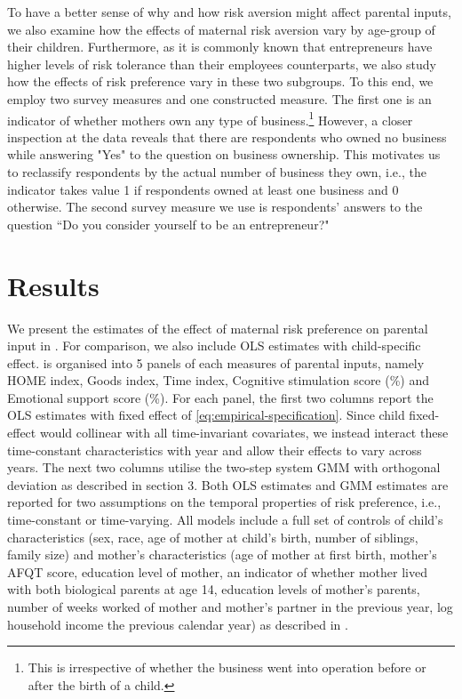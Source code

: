 \documentclass[]{article}
\begin{document}
To have a better sense of why and how risk aversion might affect parental inputs, we also examine how the effects of maternal risk aversion vary by age-group of their children. Furthermore, as it is commonly known that entrepreneurs have higher levels of risk tolerance than their employees counterparts, we also study how the effects of risk preference vary in these two subgroups. To this end, we employ two survey measures and one constructed measure. The first one is an indicator of whether mothers own any type of business.\footnote{This is irrespective of whether the business went into operation before or after the birth of a child.} However, a closer inspection at the data reveals that there are respondents who owned no business while answering "Yes" to the question on business ownership. This motivates us to reclassify respondents by the actual number of business they own, i.e., the indicator takes value 1 if respondents owned at least one business and 0 otherwise. The second survey measure we use is respondents' answers to the question ``Do you consider yourself to be an entrepreneur?"


\section{Results}
We present the estimates of the effect of maternal risk preference on parental input in . For comparison, we also include OLS estimates with child-specific effect.  is organised into 5 panels of each measures of parental inputs, namely HOME index, Goods index, Time index, Cognitive stimulation score (\%) and Emotional support score (\%). For each panel, the first two columns report the OLS estimates with fixed effect of \eqref{eq:empirical-specification}. Since child fixed-effect would collinear with all time-invariant covariates, we instead interact these time-constant characteristics with year and allow their effects to vary across years. The next two columns utilise the two-step system GMM with orthogonal deviation as described in section 3. Both OLS estimates and GMM estimates are reported for two assumptions on the temporal properties of risk preference, i.e., time-constant or time-varying. All models include a full set of controls of child's characteristics (sex, race, age of mother at child's birth, number of siblings, family size) and mother's characteristics (age of mother at first birth, mother's AFQT score, education level of mother, an indicator of whether mother lived with both biological parents at age 14, education levels of mother's parents, number of weeks worked of mother and mother's partner in the previous year, log household income the previous calendar year) as described in .  
\end{document}
